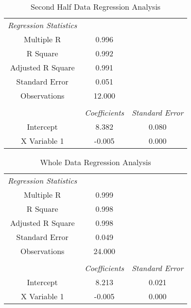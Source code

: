 \documentclass[11pt]{article}
\begin{document}
	\begin{table}[htbp]
		\centering
		\caption{Second Half Data Regression Analysis}
		\begin{tabular}{ccc}
			\cmidrule{1-2}    \textit{Regression Statistics} &   &  \\
			\cmidrule{1-2}    Multiple R & 0.996 &  \\
			R Square & 0.992 &  \\
			Adjusted R Square & 0.991 &  \\
			Standard Error & 0.051 &  \\
			Observations & 12.000 &  \\
			\cmidrule{1-2}      &   &  \\
			\midrule
			& \textit{Coefficients} & \textit{Standard Error} \\
			\midrule
			Intercept & 8.382 & 0.080 \\
			X Variable 1 & -0.005 & 0.000 \\
			\bottomrule
		\end{tabular}%
		\label{tab:13_Table_4}%
	\end{table}%
	
	\begin{table}[htbp]
		\centering
		\caption{Whole Data Regression Analysis}
		\begin{tabular}{ccc}
			\cmidrule{1-2}    \textit{Regression Statistics} &   &  \\
			\cmidrule{1-2}    Multiple R & 0.999 &  \\
			R Square & 0.998 &  \\
			Adjusted R Square & 0.998 &  \\
			Standard Error & 0.049 &  \\
			Observations & 24.000 &  \\
			\cmidrule{1-2}      &   &  \\
			\midrule
			& \textit{Coefficients} & \textit{Standard Error} \\
			\midrule
			Intercept & 8.213 & 0.021 \\
			X Variable 1 & -0.005 & 0.000 \\
			\bottomrule
		\end{tabular}%
		\label{tab:13_Table_5}%
	\end{table}%
	
	
	
	
	
\clearpage
\end{document}
